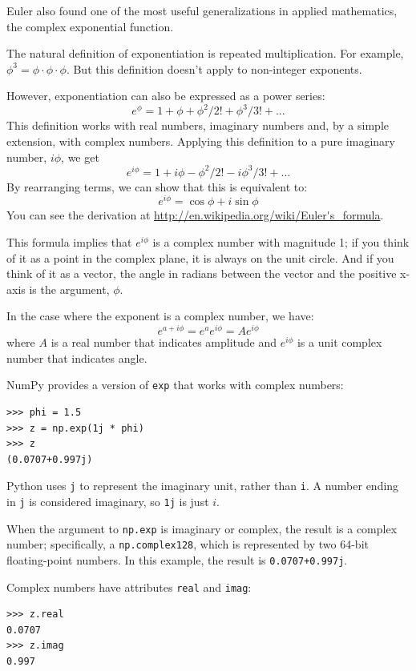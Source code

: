 \documentclass[12pt]{book}
\begin{document}
Euler also found one of the most useful generalizations in applied
mathematics, the complex exponential function.

The natural definition of exponentiation is repeated multiplication.
For example, $\phi^3 = \phi \cdot \phi \cdot \phi$.  But this
definition doesn't apply to non-integer exponents.

However, exponentiation can also be expressed as a power series:
%
\[ e^\phi = 1 + \phi + \phi^2/2! + \phi^3/3! + ... \]
%
This definition works with real numbers, imaginary numbers and, by a simple
extension, with complex numbers.  Applying this definition
to a pure imaginary number, $i\phi$, we get
%
\[ e^{i\phi} = 1 + i\phi - \phi^2/2! - i\phi^3/3! + ... \]
%
By rearranging terms, we can show that this is equivalent to:
%
\[ e^{i\phi} = \cos \phi + i \sin \phi \]
%
You can see the derivation at
\url{http://en.wikipedia.org/wiki/Euler's_formula}.

This formula
implies that $e^{i\phi}$ is a complex number with magnitude 1; if you
think of it as a point in the complex plane, it is always on the unit
circle.  And if you think of it as a vector, the angle in radians
between the vector and the positive x-axis is the argument, $\phi$.

In the case where the exponent is a complex number, we have:
%
\[ e^{a + i\phi} = e^a e^{i\phi} = A e^{i\phi} \]
%
where $A$ is a real number that indicates amplitude and
$e^{i\phi}$ is a unit complex number that indicates angle.

NumPy provides a version of {\tt exp} that works with complex numbers:

\begin{verbatim}
>>> phi = 1.5
>>> z = np.exp(1j * phi)
>>> z
(0.0707+0.997j)
\end{verbatim}

Python uses {\tt j} to represent the imaginary unit, rather
than {\tt i}.  A number ending in {\tt j} is considered imaginary,
so {\tt 1j} is just $i$.

When the argument to {\tt np.exp} is imaginary or complex, the
result is a complex number; specifically, a {\tt np.complex128},
which is represented by two 64-bit floating-point numbers.
In this example, the result is {\tt 0.0707+0.997j}.

Complex numbers have attributes {\tt real} and {\tt imag}:

\begin{verbatim}
>>> z.real
0.0707
>>> z.imag
0.997
\end{verbatim}
\end{document}

